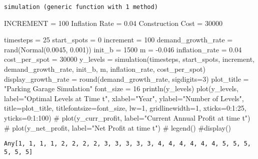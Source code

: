 \documentclass[
  11pt,
]{article}
\newenvironment{Shaded}{\begin{snugshade}}{\end{snugshade}}
\newcommand{\CommentTok}[1]{\textcolor[rgb]{0.37,0.37,0.37}{#1}}
\newcommand{\FloatTok}[1]{\textcolor[rgb]{0.68,0.00,0.00}{#1}}
\newcommand{\FunctionTok}[1]{\textcolor[rgb]{0.28,0.35,0.67}{#1}}
\newcommand{\NormalTok}[1]{\textcolor[rgb]{0.00,0.23,0.31}{#1}}
\newcommand{\OperatorTok}[1]{\textcolor[rgb]{0.37,0.37,0.37}{#1}}
\newcommand{\StringTok}[1]{\textcolor[rgb]{0.13,0.47,0.30}{#1}}
\begin{document}
\begin{verbatim}
simulation (generic function with 1 method)
\end{verbatim}

INCREMENT = 100 Inflation Rate = 0.04 Construction Cost = 30000

\begin{Shaded}
\begin{Highlighting}[numbers=left,,]
\NormalTok{timesteps }\OperatorTok{=} \FloatTok{25} 
\NormalTok{start\_spots }\OperatorTok{=} \FloatTok{0}
\NormalTok{increment }\OperatorTok{=} \FloatTok{100}
\NormalTok{demand\_growth\_rate }\OperatorTok{=} \FunctionTok{rand}\NormalTok{(}\FunctionTok{Normal}\NormalTok{(}\FloatTok{0.0045}\NormalTok{, }\FloatTok{0.001}\NormalTok{))}
\NormalTok{init\_b }\OperatorTok{=} \FloatTok{1500}
\NormalTok{m }\OperatorTok{=} \OperatorTok{{-}}\FloatTok{0.046}
\NormalTok{inflation\_rate }\OperatorTok{=} \FloatTok{0.04}
\NormalTok{cost\_per\_spot }\OperatorTok{=} \FloatTok{30000}
\NormalTok{y\_levels }\OperatorTok{=} \FunctionTok{simulation}\NormalTok{(timesteps, start\_spots, increment, demand\_growth\_rate, init\_b, m, inflation\_rate, cost\_per\_spot)}
\NormalTok{display\_growth\_rate }\OperatorTok{=} \FunctionTok{round}\NormalTok{(demand\_growth\_rate, sigdigits}\OperatorTok{=}\FloatTok{3}\NormalTok{)}
\NormalTok{plot\_title }\OperatorTok{=} \StringTok{"Parking Garage Simulation"}
\NormalTok{font\_size }\OperatorTok{=} \FloatTok{16}
\FunctionTok{println}\NormalTok{(y\_levels)}
\FunctionTok{plot}\NormalTok{(y\_levels, label}\OperatorTok{=}\StringTok{"Optimal Levels at Time t"}\NormalTok{, xlabel}\OperatorTok{=}\StringTok{"Year"}\NormalTok{, ylabel}\OperatorTok{=}\StringTok{"Number of Levels"}\NormalTok{,}
\NormalTok{title}\OperatorTok{=}\NormalTok{plot\_title, titlefontsize}\OperatorTok{=}\NormalTok{font\_size, lw}\OperatorTok{=}\FloatTok{1}\NormalTok{, gridlinewidth}\OperatorTok{=}\FloatTok{1}\NormalTok{, xticks}\OperatorTok{=}\FloatTok{0}\OperatorTok{:}\FloatTok{1}\OperatorTok{:}\FloatTok{25}\NormalTok{, yticks}\OperatorTok{=}\FloatTok{0}\OperatorTok{:}\FloatTok{1}\OperatorTok{:}\FloatTok{100}\NormalTok{)}
\CommentTok{\# plot(y\_curr\_profit, label="Current Annual Profit at time t")}
\CommentTok{\# plot(y\_net\_profit, label="Net Profit at time t")}
\CommentTok{\# legend()}
\CommentTok{\#display()}
\end{Highlighting}
\end{Shaded}

\begin{verbatim}
Any[1, 1, 1, 1, 2, 2, 2, 2, 3, 3, 3, 3, 3, 4, 4, 4, 4, 4, 4, 5, 5, 5, 5, 5, 5]
\end{verbatim}
\end{document}
